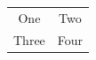 \documentclass[paper=A4]{ropas-poster}
\begin{document}
\ifdim\tabcolsep=10bp\else
  \PackageError{ropas-test}{Incorrect document tabular spacing}{}
\fi
\begin{tabular}{cc}
  One & Two \\
  Three & Four
\end{tabular}
\end{document}
